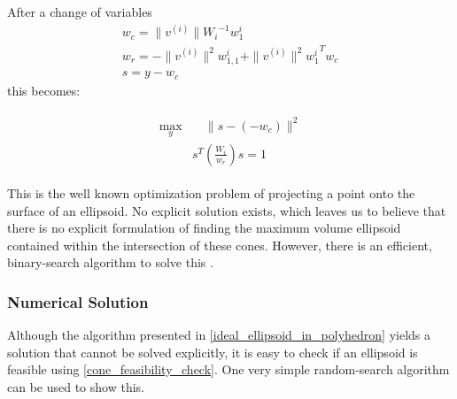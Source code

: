 \documentclass{article}
\theoremstyle{case}
\begin{document}
After a change of variables
\begin{align*}
w_c = \|v^{(i)}\|{W_i}^{-1}w_1^i \\
w_r =  - \|v^{(i)}\|^2{w_{1,1}^i} + \|v^{(i)}\|^2{{w_1^i}}^Tw_c \\
s = y - w_c
\end{align*}
this becomes:

\begin{align}
\label{cone_feasibility_check}
\begin{array}{ccc}
\max_{y} & \quad \|s - \left(-w_c\right)\|^2  \\
 & s^T\left(\frac {W_i}{w_r}\right)s = 1
 \end{array}
\end{align}

This is the well known optimization problem of projecting a point onto the surface of an ellipsoid.
No explicit solution exists, which leaves us to believe that there is no explicit formulation of finding the maximum volume ellipsoid contained within the intersection of these cones.
However, there is an efficient, binary-search algorithm to solve this \cite{projecttoellipsoid}.

\subsubsection{Numerical Solution}

Although the algorithm presented in \cref{ideal_ellipsoid_in_polyhedron} yields a solution that cannot be solved explicitly, it is easy to check if an ellipsoid is feasible using \cref{cone_feasibility_check}.
One very simple random-search algorithm can be used to show this.
\end{document}
